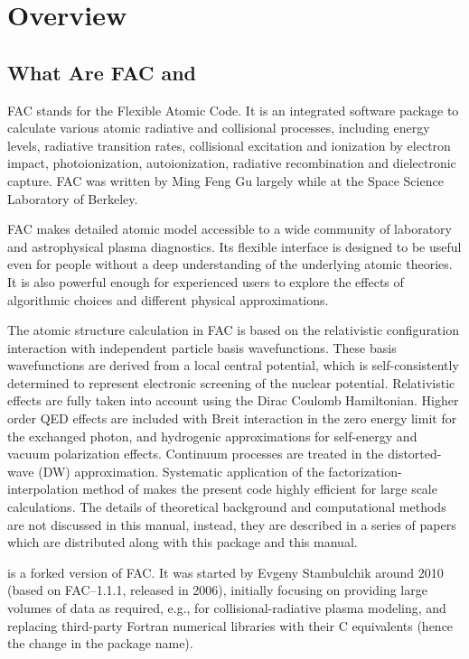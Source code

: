 \chapter{Overview}
\label{cha:overview}

\section{What Are FAC and \cFAC}
FAC stands for the Flexible Atomic Code. It is an integrated software package to
calculate various atomic radiative and collisional processes, including energy
levels, radiative transition rates, collisional excitation and  ionization by
electron impact, photoionization, autoionization, radiative recombination and
dielectronic capture. FAC was written by Ming Feng Gu largely while at the Space
Science Laboratory of Berkeley. 

FAC makes detailed atomic model accessible to a wide community of laboratory and
astrophysical plasma diagnostics. Its flexible interface is designed to be
useful even for people without a deep understanding of the underlying atomic
theories. It is also powerful enough for experienced users to explore the
effects of algorithmic choices and different physical approximations.

The atomic structure calculation in FAC is based on the relativistic
configuration interaction with independent particle basis wavefunctions. These
basis wavefunctions are derived from a local central potential, which is
self-consistently determined to represent electronic screening of the nuclear
potential. Relativistic effects are fully taken into account using the Dirac
Coulomb Hamiltonian. Higher order QED effects are included with Breit
interaction in the zero energy limit for the exchanged photon, and hydrogenic
approximations for self-energy and vacuum polarization effects. Continuum
processes are treated in the distorted-wave (DW) approximation. Systematic
application of the factorization-interpolation method of \citet{barshalom:1988a}
makes the present code highly efficient for large scale calculations. The
details of theoretical background and computational methods are not discussed in
this manual, instead, they are described in a series of papers which are
distributed along with this package and this manual.

\cFAC is a forked version of FAC. It was started by Evgeny Stambulchik
around 2010 (based on FAC--1.1.1, released in 2006), initially focusing on
providing large volumes of data as required, e.g., for collisional-radiative
plasma modeling, and replacing third-party Fortran numerical libraries with
their C equivalents (hence the change in the package name).

